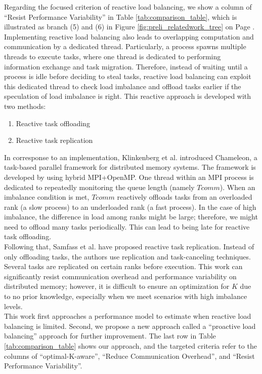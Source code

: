 Regarding the focused criterion of reactive load balancing, we show a column of ``Resist Performance Variability'' in Table \ref{tab:comparison_table}, which is illustrated as branch (5) and (6) in Figure \ref{fig:preli_relatedwork_tree} on Page \pageref{fig:preli_relatedwork_tree}. Implementing reactive load balancing also leads to overlapping computation and communication by a dedicated thread. Particularly, a process spawns multiple threads to execute tasks, where one thread is dedicated to performing information exchange and task migration. Therefore, instead of waiting until a process is idle before deciding to steal tasks, reactive load balancing can exploit this dedicated thread to check load imbalance and offload tasks earlier if the speculation of load imbalance is right. This reactive approach is developed with two methods:
\begin{enumerate}
	\item Reactive task offloading
	\item Reactive task replication
\end{enumerate}

In corresponse to an implementation, Klinkenberg et al. \cite{Klinkenberg2020ChameleonReactLB} introduced Chameleon, a task-based parallel framework for distributed memory systems. The framework is developed by using hybrid MPI+OpenMP. One thread within an MPI process is dedicated to repeatedly monitoring the queue length (namely $Tcomm$). When an imbalance condition is met, $Tcomm$ reactively offloads tasks from an overloaded rank (a slow process) to an underloaded rank (a fast process). In the case of high imbalance, the difference in load among ranks might be large; therefore, we might need to offload many tasks periodically. This can lead to being late for reactive task offloading.\\

Following that, Samfass et al. \cite{Samfass2021ChameleonReactRepLB} have proposed reactive task replication. Instead of only offloading tasks, the authors use replication and task-canceling techniques. Several tasks are replicated on certain ranks before execution. This work can significantly resist communication overhead and performance variability on distributed memory; however, it is difficult to ensure an optimization for $K$ due to no prior knowledge, especially when we meet scenarios with high imbalance levels.\\

This work first approaches a performance model to estimate when reactive load balancing is limited. Second, we propose a new approach called a ``proactive load balancing'' approach for further improvement. The last row in Table \ref{tab:comparison_table} shows our approach, and the targeted criteria refer to the columns of ``optimal-K-aware'', ``Reduce Communication Overhead'', and ``Resist Performance Variability''.


